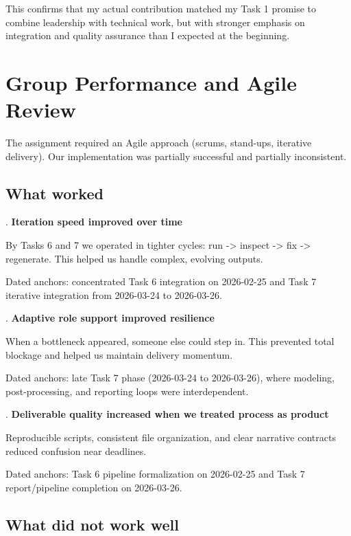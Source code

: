 \noindent This confirms that my actual contribution matched my Task 1 promise to combine leadership with technical work, but with stronger emphasis on integration and quality assurance than I expected at the beginning.


\chapter{Group Performance and Agile Review}


\noindent The assignment required an Agile approach (scrums, stand-ups, iterative delivery). Our implementation was partially successful and partially inconsistent.


\section{What worked}


. \textbf{Iteration speed improved over time}

\noindent By Tasks 6 and 7 we operated in tighter cycles: run -> inspect -> fix -> regenerate. This helped us handle complex, evolving outputs.

\noindent Dated anchors: concentrated Task 6 integration on 2026-02-25 and Task 7 iterative integration from 2026-03-24 to 2026-03-26.


. \textbf{Adaptive role support improved resilience}

\noindent When a bottleneck appeared, someone else could step in. This prevented total blockage and helped us maintain delivery momentum.

\noindent Dated anchors: late Task 7 phase (2026-03-24 to 2026-03-26), where modeling, post-processing, and reporting loops were interdependent.


. \textbf{Deliverable quality increased when we treated process as product}

\noindent Reproducible scripts, consistent file organization, and clear narrative contracts reduced confusion near deadlines.

\noindent Dated anchors: Task 6 pipeline formalization on 2026-02-25 and Task 7 report/pipeline completion on 2026-03-26.


\section{What did not work well}


